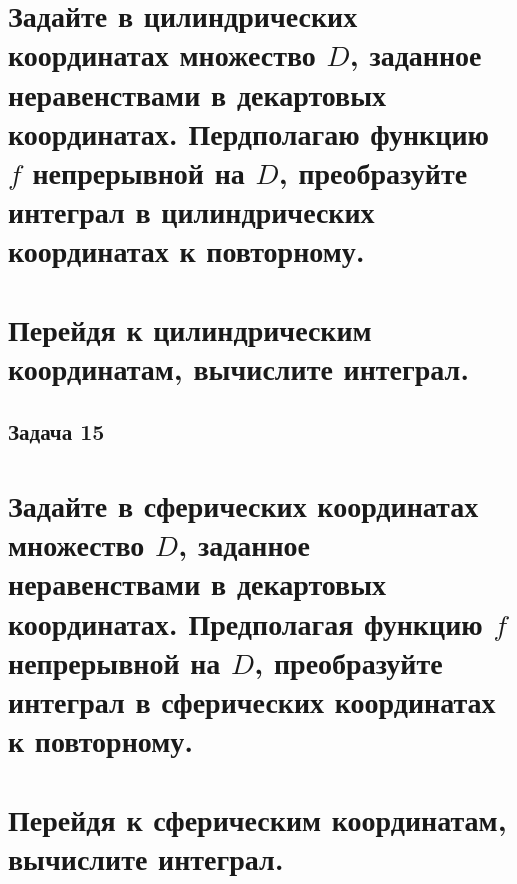 \documentclass[a4paper, fleqn]{article}
\begin{document}
    
    
    \section*{Задайте в цилиндрических координатах множество $D$, заданное неравенствами в декартовых
    координатах. Пердполагаю функцию $f$ непрерывной на $D$, преобразуйте интеграл в цилиндрических
    координатах к повторному.}
    
    
    \section*{Перейдя к цилиндрическим координатам, вычислите интеграл.}
    \subsection*{Задача 15}
    
    
    \section*{Задайте в сферических координатах множество $D$, заданное неравенствами в декартовых координатах.
    Предполагая функцию $f$ непрерывной на $D$, преобразуйте интеграл в сферических координатах к повторному.}
    
    
    \section*{Перейдя к сферическим координатам, вычислите интеграл.}
    
    
\end{document}
